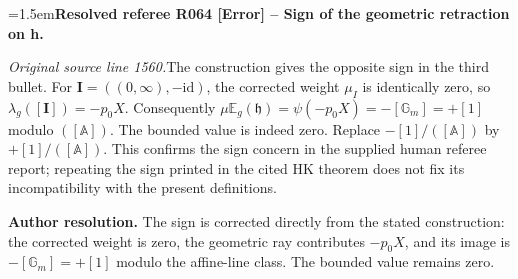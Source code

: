\documentclass[12pt]{amsart}
\newcommand{\ResolvedRefereeRemark}[5]{%
  \par\medskip\begingroup\normalfont\small\color{gray}%
  \emergencystretch=1.5em\noindent\textbf{Resolved referee R#1 [#2] -- #3.}\par\nobreak\noindent #4\par
  \medskip\color{ResolutionGreen}\noindent\textbf{Author resolution.} #5\par
  \endgroup\medskip
}
\theoremstyle{plain}
\theoremstyle{definition}
\theoremstyle{remark}
\numberwithin{equation}{section}
\theoremstyle{plain}
\newcommand{\G}{\mathds{G}}
\newcommand{\0}{\emptyset}
\begin{document}
\ResolvedRefereeRemark{064}{Error}{Sign of the geometric retraction on h}{%
\textit{Original source line 1560.}\quad The construction gives the opposite sign in the third bullet. For $\bm I=((0,\infty),-\mathrm{id})$, the corrected weight $\mu_I$ is identically zero, so $\lambda_g([\bm I])=-p_0X$. Consequently $\mu\mathbb E_g(\mathfrak h)=\psi(-p_0X)=-[\mathbb G_m]=+[1]$ modulo $([\mathbb A])$. The bounded value is indeed zero. Replace $-[1]/([\mathbb A])$ by $+[1]/([\mathbb A])$. This confirms the sign concern in the supplied human referee report; repeating the sign printed in the cited HK theorem does not fix its incompatibility with the present definitions.
}{The sign is corrected directly from the stated construction: the corrected weight is zero, the geometric ray contributes $-p_0X$, and its image is $-[\G_m]=+[1]$ modulo the affine-line class. The bounded value remains zero.}
\end{document}
